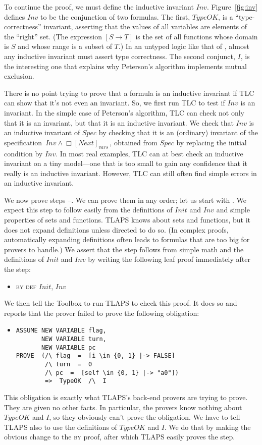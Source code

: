 \documentclass[a4paper,draft]{llncs}
\makeatletter
\newcommand{\step}[2]{{\tlatex \@pfstepnum{#1}{#2}}}
\newenvironment{display}{\begin{itemize}\item[]}{\end{itemize}}
\makeatother
\begin{document}
To continue the proof, we must define the inductive invariant $Inv$.
Figure~\ref{fig:inv} defines $Inv$ to be the conjunction of two formulas.
The first, $TypeOK$, is a ``type-correctness'' invariant, asserting that the
values of all variables are elements of the ``right'' set.  (The
expression $[S\rightarrow T]$ is the set of all functions whose domain is
$S$ and whose range is a subset of $T$.)  In an untyped logic like that of
\tlaplus, almost any inductive invariant must assert type correctness.
The second conjunct, $I$, is the interesting one that explains why
Peterson's algorithm implements mutual exclusion.

There is no point trying to prove that a formula is an inductive
invariant if TLC can show that it's not even an invariant.  So, we
first run TLC to test if $Inv$ is an invariant. In the simple case of
Peterson's algorithm, TLC can check not only that it is an invariant, but
that it is an inductive invariant.  We check that $Inv$ is an
inductive invariant of $Spec$ by checking that it is an (ordinary)
invariant of the specification 
 \,\mbox{$Inv \land \Box[Next]_{vars}$}\,,
obtained from $Spec$ by replacing the initial condition by $Inv$.
In most real examples, TLC can at best check an inductive invariant on
a tiny model---one that is too small to gain any confidence that
it really is an inductive invariant.  However, TLC can still often find
simple errors in an inductive invariant.

We now prove steps \step{1}{1}--\step{1}{3}.  We can prove them in any
order; let us start with \step{1}{1}.  We expect this step to follow
easily from the definitions of $Init$ and $Inv$ and simple properties
of sets and functions.  TLAPS knows about sets and functions, but it
does not expand definitions unless directed to do so.  (In complex
proofs, automatically expanding definitions often leads to formulas
that are too big for provers to handle.)  We assert that the
step follows from simple math and the definitions of $Init$ and $Inv$
by writing the following leaf proof immediately after the step:
\begin{display}
\textsc{by def} $Init$, $Inv$
\end{display}
We then tell the Toolbox to run TLAPS to check this proof.  It does so
and reports that the prover failed to prove the following obligation:
\begin{display}
\small
\begin{verbatim}
ASSUME NEW VARIABLE flag,
       NEW VARIABLE turn,
       NEW VARIABLE pc
PROVE  (/\ flag  =  [i \in {0, 1} |-> FALSE]
        /\ turn  =  0
        /\ pc  =  [self \in {0, 1} |-> "a0"])
        =>  TypeOK  /\  I
\end{verbatim}
\end{display}
This obligation is exactly what TLAPS's back-end provers are trying to
prove.  They are given no other facts.  In particular, the
provers know nothing about $TypeOK$ and $I$, so they obviously can't
prove the obligation.  We have to tell TLAPS also to use the definitions
of $TypeOK$ and $I$.  We do that by making the obvious change to the
\textsc{by} proof, after which TLAPS easily proves the step.
\end{document}
